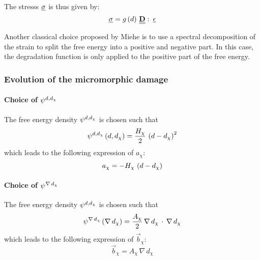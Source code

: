 The stresss \(\underline{\sigma}\) is thus given by:
\begin{equation}
  \underline{\sigma} = g\left(d\right)\,\underline{\underline{\mathbf{D}}}\,\colon\,\underline{\epsilon}
\end{equation}

Another classical choice proposed by Miehe \cite{miehe_phase_2010} is to
use a spectral decomposition of the strain to split the free energy into
a positive and negative part. In this case, the degradation function is only applied
to the positive part of the free energy.

\subsubsection{Evolution of the micromorphic damage}

\paragraph{Choice of \({\psi}^{d, d_{\chi}}\)}

The free energy density ${\psi}^{d, d_{\chi}}$ is chosen such that
%
%
%
\begin{equation}
  {\psi}^{d, d_{\chi}}\left(d, d_{\chi}\right)=\displaystyle \frac{\displaystyle H_{\chi}}{\displaystyle 2}\,\left(d-d_{\chi}\right)^{2}
\end{equation}
%
%
%
which leads to the following expression of \(a_{\chi}\):
\begin{equation}
  \label{eq:micromorphicdamage:achi}
  a_{\chi} = - H_{\chi}\,\left(d-d_{\chi}\right)
\end{equation}

\paragraph{Choice of \({\psi}^{\nabla\,d_{\chi}}\)}

The free energy density ${\psi}^{d, d_{\chi}}$ is chosen such that
%
%
%
\begin{equation}
  \label{eq:micromorphicdamage:freeenergygdchi}
  {\psi}^{\nabla\,d_{\chi}}\left(\nabla\, d_{\chi}\right) = \displaystyle \frac{\displaystyle A_{\chi}}{\displaystyle 2}\,\nabla\, d_{\chi}\,\cdot\,\nabla\, d_{\chi}
\end{equation}
%
%
%
which leads to the following expression of \(\vec{b}_{\chi}\):
%
%
%
\begin{equation}
  \label{eq:micromorphicdamage:bchi}
  \vec{b}_{\chi} = A_{\chi}\,\nabla\, d_{\chi}
\end{equation}

